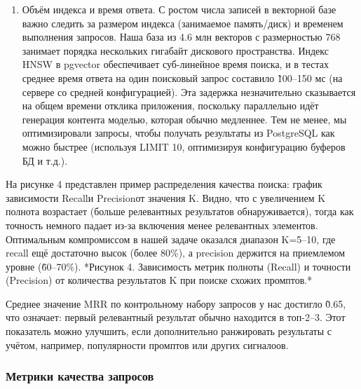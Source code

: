 \begin{enumerate}[label=\arabic*.]
\item Объём индекса и время ответа. С ростом числа записей в векторной базе важно следить за размером индекса (занимаемое память/диск) и временем выполнения запросов. Наша база из 4.6 млн векторов с размерностью 768 занимает порядка нескольких гигабайт дискового пространства. Индекс HNSW в pgvector обеспечивает суб-линейное время поиска, и в тестах среднее время ответа на один поисковый запрос составило \~100–150 мс (на сервере со средней конфигурацией). Эта задержка незначительно сказывается на общем времени отклика приложения, поскольку параллельно идёт генерация контента моделью, которая обычно медленнее. Тем не менее, мы оптимизировали запросы, чтобы получать результаты из PostgreSQL как можно быстрее (используя LIMIT 10, оптимизируя конфигурацию буферов БД и т.д.).
\end{enumerate}

На рисунке 4 представлен пример распределения качества поиска: график зависимости Recall\@K и Precision\@K от значения K. Видно, что с увеличением K полнота возрастает (больше релевантных результатов обнаруживается), тогда как точность немного падает из-за включения менее релевантных элементов. Оптимальным компромиссом в нашей задаче оказался диапазон K=5–10, где recall ещё достаточно высок (более 80\%), а precision держится на приемлемом уровне (\~60–70\%). *Рисунок 4. Зависимость метрик полноты (Recall) и точности (Precision) от количества результатов K при поиске схожих промптов.*

Среднее значение MRR по контрольному набору запросов у нас достигло \~0.65, что означает: первый релевантный результат обычно находится в топ-2–3. Этот показатель можно улучшить, если дополнительно ранжировать результаты с учётом, например, популярности промптов или других сигналоов.

\subsubsection{Метрики качества запросов}

